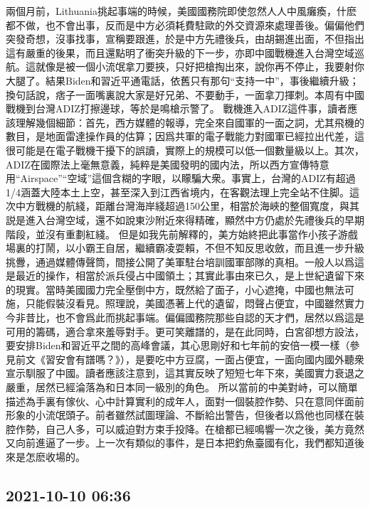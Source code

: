 \documentclass[twocolumn]{ctexart}
\begin{document}
兩個月前，Lithuania挑起事端的時候，美國國務院即使忽然人人中風癱瘓，什麽都不做，也不會出事，反而是中方必須耗費駐歐的外交資源來處理善後。偏偏他們突發奇想，沒事找事，宣稱要跟進，於是中方先禮後兵，由胡錫進出面，不但指出這有嚴重的後果，而且還點明了衝突升級的下一步，亦即中國戰機進入台灣空域巡航。這就像是被一個小流氓拿刀要挾，只好把槍掏出來，說你再不停止，我要射你大腿了。結果Biden和習近平通電話，依舊只有那句“支持一中”，事後繼續升級；換句話說，痞子一面嘴裏說大家是好兄弟、不要動手，一面拿刀揮刺。本周有中國戰機到台灣ADIZ打擦邊球，等於是鳴槍示警了。
戰機進入ADIZ這件事，讀者應該理解幾個細節：首先，西方媒體的報導，完全來自國軍的一面之詞，尤其飛機的數目，是地面雷達操作員的估算；因爲共軍的電子戰能力對國軍已經拉出代差，這很可能是在電子戰機干擾下的誤讀，實際上的規模可以低一個數量級以上。其次，ADIZ在國際法上毫無意義，純粹是美國發明的國内法，所以西方宣傳特意用“Airspace”“空域”這個含糊的字眼，以矇騙大衆。事實上，台灣的ADIZ有超過1/4涵蓋大陸本土上空，甚至深入到江西省境内，在客觀法理上完全站不住脚。這次中方戰機的航綫，距離台灣海岸綫超過150公里，相當於海峽的整個寬度，與其説是進入台灣空域，還不如說東沙附近來得精確，顯然中方仍處於先禮後兵的早期階段，並沒有重劃紅綫。
但是如我先前解釋的，美方始終把此事當作小孩子游戲場裏的打鬧，以小霸王自居，繼續霸凌耍賴，不但不知反思收斂，而且進一步升級挑釁，通過媒體傳聲筒，間接公開了美軍駐台培訓國軍部隊的真相。一般人以爲這是最近的操作，相當於派兵侵占中國領土；其實此事由來已久，是上世紀遺留下來的現實。當時美國國力完全壓倒中方，既然給了面子，小心遮掩，中國也無法可施，只能假裝沒看見。照理說，美國憑著上代的遺留，悶聲占便宜，中國雖然實力今非昔比，也不會爲此而挑起事端。偏偏國務院那些自認的天才們，居然以爲這是可用的籌碼，適合拿來羞辱對手。更可笑離譜的，是在此同時，白宮卻想方設法，要安排Biden和習近平之間的高峰會議，其心思剛好和七年前的安倍一模一樣（參見前文《習安會有譜嗎？》），是要吃中方豆腐，一面占便宜，一面向國内國外聽衆宣示馴服了中國。讀者應該注意到，這其實反映了短短七年下來，美國實力衰退之嚴重，居然已經淪落為和日本同一級別的角色。
所以當前的中美對峙，可以簡單描述為手裏有傢伙、心中計算實利的成年人，面對一個裝腔作勢、只在意同伴面前形象的小流氓頭子。前者雖然試圖理論、不斷給出警告，但後者以爲他也同樣在裝腔作勢，自己人多，可以威迫對方束手投降。在槍都已經鳴響一次之後，美方竟然又向前進逼了一步。上一次有類似的事件，是日本把釣魚臺國有化，我們都知道後來是怎麽收場的。
\subsection*{2021-10-10 06:36}
\end{document}
